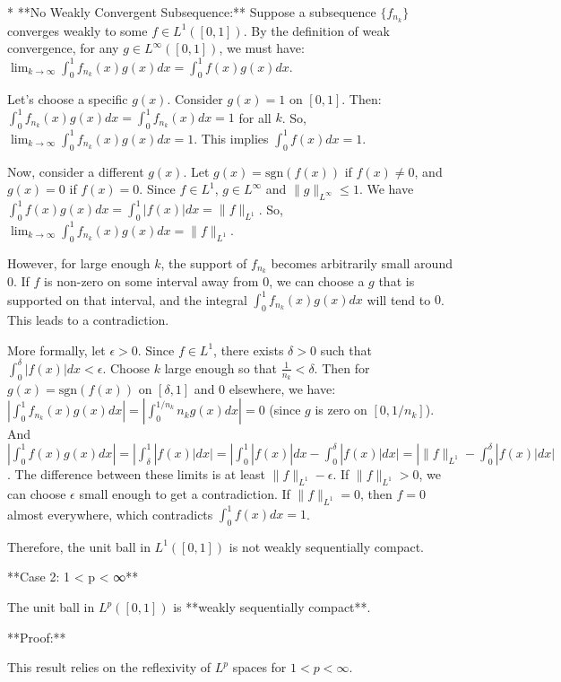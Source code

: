 * **No Weakly Convergent Subsequence:** Suppose a subsequence $\{f_{n_k}\}$ converges weakly to some $f \in L^1([0, 1])$. By the definition of weak convergence, for any $g \in L^\infty([0, 1])$, we must have:
    $\lim_{k \to \infty} \int_0^1 f_{n_k}(x) g(x) dx = \int_0^1 f(x) g(x) dx$.

    Let's choose a specific $g(x)$. Consider $g(x) = 1$ on $[0, 1]$. Then:
    $\int_0^1 f_{n_k}(x) g(x) dx = \int_0^1 f_{n_k}(x) dx = 1$ for all $k$.
    So, $\lim_{k \to \infty} \int_0^1 f_{n_k}(x) g(x) dx = 1$.
    This implies $\int_0^1 f(x) dx = 1$.

    Now, consider a different $g(x)$. Let $g(x) = \text{sgn}(f(x))$ if $f(x) \neq 0$, and $g(x) = 0$ if $f(x) = 0$. Since $f \in L^1$, $g \in L^\infty$ and $\|g\|_{L^\infty} \le 1$.
    We have $\int_0^1 f(x) g(x) dx = \int_0^1 |f(x)| dx = \|f\|_{L^1}$.
    So, $\lim_{k \to \infty} \int_0^1 f_{n_k}(x) g(x) dx = \|f\|_{L^1}$.

    However, for large enough $k$, the support of $f_{n_k}$ becomes arbitrarily small around $0$. If $f$ is non-zero on some interval away from $0$, we can choose a $g$ that is supported on that interval, and the integral $\int_0^1 f_{n_k}(x) g(x) dx$ will tend to $0$. This leads to a contradiction.

    More formally, let $\epsilon > 0$. Since $f \in L^1$, there exists $\delta > 0$ such that $\int_0^\delta |f(x)| dx < \epsilon$. Choose $k$ large enough so that $\frac{1}{n_k} < \delta$. Then for $g(x) = \text{sgn}(f(x))$ on $[\delta, 1]$ and $0$ elsewhere, we have:
    $|\int_0^1 f_{n_k}(x) g(x) dx| = |\int_0^{1/n_k} n_k g(x) dx| = 0$ (since $g$ is zero on $[0, 1/n_k]$).
    And $|\int_0^1 f(x) g(x) dx| = |\int_\delta^1 |f(x)| dx| = |\int_0^1 |f(x)| dx - \int_0^\delta |f(x)| dx| = |\|f\|_{L^1} - \int_0^\delta |f(x)| dx|$.
    The difference between these limits is at least $\|f\|_{L^1} - \epsilon$. If $\|f\|_{L^1} > 0$, we can choose $\epsilon$ small enough to get a contradiction. If $\|f\|_{L^1} = 0$, then $f = 0$ almost everywhere, which contradicts $\int_0^1 f(x) dx = 1$.

Therefore, the unit ball in $L^1([0, 1])$ is not weakly sequentially compact.

**Case 2: 1 < p < ∞**

The unit ball in $L^p([0, 1])$ is **weakly sequentially compact**.

**Proof:**

This result relies on the reflexivity of $L^p$ spaces for $1 < p < \infty$.

